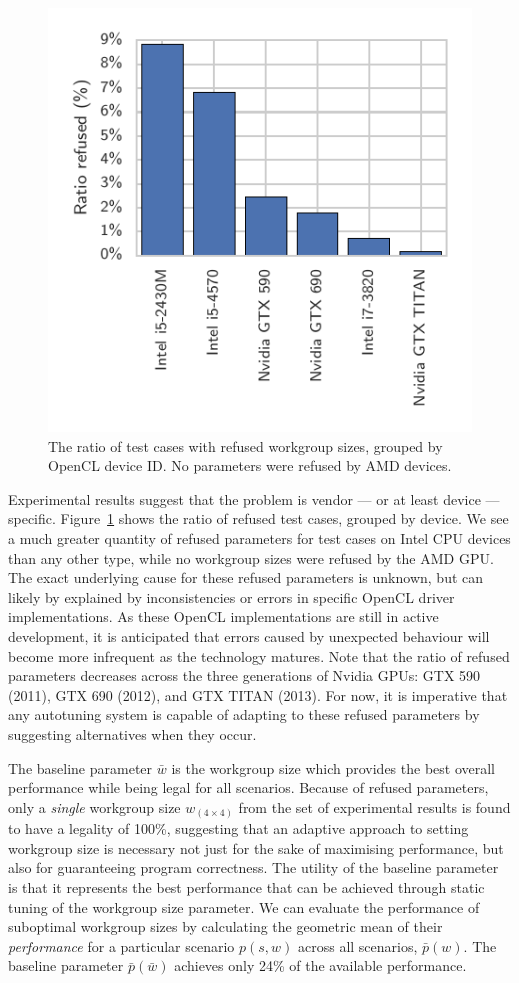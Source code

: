 \documentclass[nonatbib,preprint,10pt]{sigplanconf}
\begin{document}
\begin{figure}
  \centering
  \centering
  \includegraphics[width=.75\columnwidth]{img/refused_params_by_device}
  \caption[Refused workgroup sizes by device and vendor]{%
    The ratio of test cases with refused workgroup sizes, grouped by
    OpenCL device ID. No parameters were refused by AMD devices.%
  }
\label{fig:refused-params}
\end{figure}

Experimental results suggest that the problem is vendor --- or at
least device --- specific. Figure~\ref{fig:refused-params} shows the
ratio of refused test cases, grouped by device. We see a much greater
quantity of refused parameters for test cases on Intel CPU devices
than any other type, while no workgroup sizes were refused by the AMD
GPU. The exact underlying cause for these refused parameters is
unknown, but can likely by explained by inconsistencies or errors in
specific OpenCL driver implementations. As these OpenCL
implementations are still in active development, it is anticipated
that errors caused by unexpected behaviour will become more infrequent
as the technology matures. Note that the ratio of refused parameters
decreases across the three generations of Nvidia GPUs: GTX 590 (2011),
GTX 690 (2012), and GTX TITAN (2013). For now, it is imperative that
any autotuning system is capable of adapting to these refused
parameters by suggesting alternatives when they occur.

The baseline parameter $\bar{w}$ is the workgroup size which provides
the best overall performance while being legal for all
scenarios. Because of refused parameters, only a \emph{single}
workgroup size $w_{(4 \times 4)}$ from the set of experimental results
is found to have a legality of 100\%, suggesting that an adaptive
approach to setting workgroup size is necessary not just for the sake
of maximising performance, but also for guaranteeing program
correctness. The utility of the baseline parameter is that it
represents the best performance that can be achieved through static
tuning of the workgroup size parameter. We can evaluate the
performance of suboptimal workgroup sizes by calculating the geometric
mean of their \emph{performance} for a particular scenario $p(s, w)$
across all scenarios, $\bar{p}(w)$. The baseline parameter
$\bar{p}(\bar{w})$ achieves only 24\% of the available performance.
\end{document}
